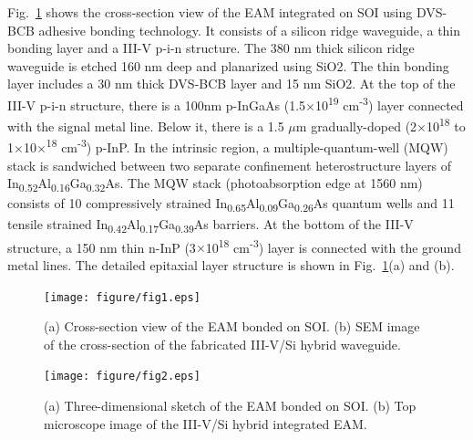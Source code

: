 \documentclass[aip,apl,reprint,a4paper]{revtex4-1}
\def\SP#1{\textsuperscript{#1}}
\def\SB#1{\textsubscript{#1}}
\begin{document}
Fig.~\ref{fig:1} shows the cross-section view of the EAM integrated on SOI using DVS-BCB adhesive bonding technology.\cite{roelkensiii-v-on-silicon2015} It consists of a silicon ridge waveguide, a thin bonding layer and a III-V p-i-n structure. The 380 nm thick silicon ridge waveguide is etched 160 nm deep and planarized using SiO2. The thin bonding layer includes a 30 nm thick DVS-BCB layer and 15 nm SiO2. At the top of the III-V p-i-n structure, there is a 100nm p-InGaAs (1.5$\times$10\SP{19} cm\SP{-3}) layer connected with the signal metal line. Below it, there is a 1.5 $\mu$m gradually-doped (2$\times$10\SP{18} to 1$\times$10$\times$\SP{18} cm\SP{-3}) p-InP. In the intrinsic region, a multiple-quantum-well (MQW) stack is sandwiched between two separate confinement heterostructure layers of In\SB{0.52}Al\SB{0.16}Ga\SB{0.32}As. The MQW stack (photoabsorption edge at 1560 nm) consists of 10 compressively strained In\SB{0.65}Al\SB{0.09}Ga\SB{0.26}As quantum wells and 11 tensile strained In\SB{0.42}Al\SB{0.17}Ga\SB{0.39}As barriers. At the bottom of the III-V structure, a 150 nm thin n-InP (3$\times$10\SP{18} cm\SP{-3}) layer is connected with the ground metal lines.  The detailed epitaxial layer structure is shown in Fig.~\ref{fig:1}(a) and (b).

\begin{figure}
	\texttt{[image: figure/fig1.eps]}%
	\caption{\label{fig:1} (a) Cross-section view of the EAM bonded on SOI. (b) SEM image of the cross-section of the fabricated III-V/Si hybrid waveguide.}
\end{figure}

\begin{figure}
	\texttt{[image: figure/fig2.eps]}%
	\caption{\label{fig:2} (a) Three-dimensional sketch of the EAM bonded on SOI. (b) Top microscope image of the III-V/Si hybrid integrated EAM.}
\end{figure}
\end{document}
